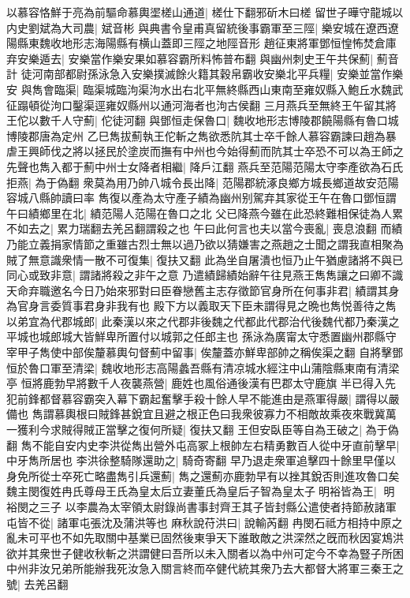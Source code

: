 以慕容恪鮮于亮為前驅命慕輿埿槎山通道|{
	槎仕下翻邪斫木曰槎}
留世子曄守龍城以内史劉斌為大司農|{
	斌音彬}
與典書令皇甫真留統後事霸軍至三陘|{
	樂安城在遼西遼陽縣東魏收地形志海陽縣有横山蓋即三陘之地陘音形}
趙征東將軍鄧恒惶怖焚倉庫弃安樂遁去|{
	安樂當作樂安果如慕容霸所料怖普布翻}
與幽州刺史王午共保薊|{
	薊音計}
徒河南部都尉孫泳急入安樂撲滅餘火籍其穀帛霸收安樂北平兵糧|{
	安樂並當作樂安}
與雋會臨渠|{
	臨渠城臨泃渠泃水出右北平無終縣西山東南至雍奴縣入鮑丘水魏武征蹋頓從泃口鑿渠逕雍奴縣州以通河海者也泃古侯翻}
三月燕兵至無終王午留其將王佗以數千人守薊|{
	佗徒河翻}
與鄧恒走保魯口|{
	魏收地形志博陵郡饒陽縣有魯口城博陵郡唐為定州}
乙巳雋拔薊執王佗斬之雋欲悉阬其士卒千餘人慕容霸諫曰趙為暴虐王興師伐之將以拯民於塗炭而撫有中州也今始得薊而阬其士卒恐不可以為王師之先聲也雋入都于薊中州士女降者相繼|{
	降戶江翻}
燕兵至范陽范陽太守李產欲為石氏拒燕|{
	為于偽翻}
衆莫為用乃帥八城令長出降|{
	范陽郡統涿良鄉方城長鄉道故安范陽容城八縣帥讀曰率}
雋復以產為太守產子績為幽州别駕弃其家從王午在魯口鄧恒謂午曰績鄉里在北|{
	績范陽人范陽在魯口之北}
父已降燕今雖在此恐終難相保徒為人累不如去之|{
	累力瑞翻去羌呂翻謂殺之也}
午曰此何言也夫以當今喪亂|{
	喪息浪翻}
而績乃能立義捐家情節之重雖古烈士無以過乃欲以猜嫌害之燕趙之士聞之謂我直相聚為賊了無意識衆情一散不可復集|{
	復扶又翻}
此為坐自屠潰也恒乃止午猶慮諸將不與已同心或致非意|{
	謂諸將殺之非午之意}
乃遣績歸績始辭午往見燕王雋雋讓之曰卿不識天命弃職邀名今日乃始來邪對曰臣眷戀舊主志存徵節官身所在何事非君|{
	績謂其身為官身言委質事君身非我有也}
殿下方以義取天下臣未謂得見之晩也雋悦善待之雋以弟宜為代郡城郎|{
	此秦漢以來之代郡非後魏之代都此代郡治代後魏代都乃秦漢之平城也城郎城大皆鮮卑所置付以城郭之任郎主也}
孫泳為廣甯太守悉置幽州郡縣守宰甲子雋使中部俟釐慕輿句督薊中留事|{
	俟釐蓋亦鮮卑部帥之稱俟渠之翻}
自將擊鄧恒於魯口軍至清梁|{
	魏收地形志高陽蠡吾縣有清凉城水經注中山蒲陰縣東南有清梁亭}
恒將鹿勃早將數千人夜襲燕營|{
	鹿姓也風俗通後漢有巴郡太守鹿旗}
半已得入先犯前鋒都督慕容霸突入幕下霸起奮擊手殺十餘人早不能進由是燕軍得嚴|{
	謂得以嚴備也}
雋謂慕輿根曰賊鋒甚銳宜且避之根正色曰我衆彼寡力不相敵故乘夜來戰冀萬一獲利今求賊得賊正當擊之復何所疑|{
	復扶又翻}
王但安臥臣等自為王破之|{
	為于偽翻}
雋不能自安内史李洪從雋出營外屯高冢上根帥左右精勇數百人從中牙直前擊早|{
	中牙雋所居也}
李洪徐整騎隊還助之|{
	騎奇寄翻}
早乃退走衆軍追擊四十餘里早僅以身免所從士卒死亡略盡雋引兵還薊|{
	雋之還薊亦鹿勃早有以挫其銳否則進攻魯口矣}
魏主閔復姓冉氏尊母王氏為皇太后立妻董氏為皇后子智為皇太子明裕皆為王|{
	明裕閔之三子}
以李農為太宰領太尉錄尚書事封齊王其子皆封縣公遣使者持節赦諸軍屯皆不從|{
	諸軍屯張沈及蒲洪等也}
麻秋說苻洪曰|{
	說輸芮翻}
冉閔石祗方相持中原之亂未可平也不如先取關中基業已固然後東爭天下誰敢敵之洪深然之旣而秋因宴鴆洪欲并其衆世子健收秋斬之洪謂健曰吾所以未入關者以為中州可定今不幸為豎子所困中州非汝兄弟所能辦我死汝急入關言終而卒健代統其衆乃去大都督大將軍三秦王之號|{
	去羌呂翻}
